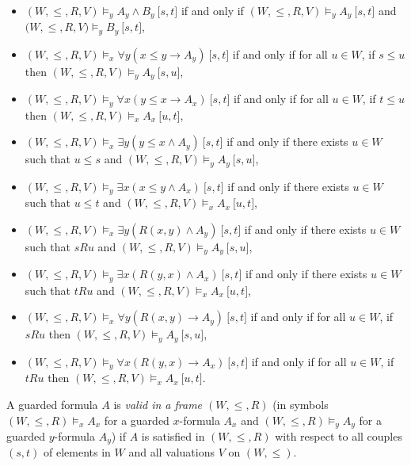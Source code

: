 \documentclass[draft]{article}
\begin{document}
\begin{itemize}
%
%
\item $(W,{\leq},{R},V){\models_{y}}A_{y}{\wedge}B_{y}\ \lbrack s,t\rbrack$ if and only if $(W,{\leq},{R},V){\models_{y}}A_{y}\ \lbrack s,t\rbrack$ and $(W,{\leq},
%
%
%
%
%
%
%
$\linebreak$
%
%
%
%
%
%
{R},V){\models_{y}}B_{y}\ \lbrack s,t\rbrack$,
%
%
\item $(W,{\leq},{R},V){\models_{x}}{\forall y}(x{\leq}y{\rightarrow}A_{y})\ \lbrack s,t\rbrack$ if and only if for all $u{\in}W$, if $s{\leq}u$ then $(W,{\leq},{R},V){\models_{y}}A_{y}\ \lbrack s,u\rbrack$,
%
%
\item $(W,{\leq},{R},V){\models_{y}}{\forall x}(y{\leq}x{\rightarrow}A_{x})\ \lbrack s,t\rbrack$ if and only if for all $u{\in}W$, if $t{\leq}u$ then $(W,{\leq},{R},V){\models_{x}}A_{x}\ \lbrack u,t\rbrack$,
%
%
\item $(W,{\leq},{R},V){\models_{x}}{\exists y}(y{\leq}x{\wedge}A_{y})\ \lbrack s,t\rbrack$ if and only if there exists $u{\in}W$ such that $u{\leq}s$ and $(W,{\leq},{R},V){\models_{y}}A_{y}\ \lbrack s,u\rbrack$,
%
%
\item $(W,{\leq},{R},V){\models_{y}}{\exists x}(x{\leq}y{\wedge}A_{x})\ \lbrack s,t\rbrack$ if and only if there exists $u{\in}W$ such that $u{\leq}t$ and $(W,{\leq},{R},V){\models_{x}}A_{x}\ \lbrack u,t\rbrack$,
%
%
\item $(W,{\leq},{R},V){\models_{x}}{\exists y}(R(x,y){\wedge}A_{y})\ \lbrack s,t\rbrack$ if and only if there exists $u{\in}W$ such that $s{R}u$ and $(W,{\leq},{R},V){\models_{y}}A_{y}\ \lbrack s,u\rbrack$,
%
%
\item $(W,{\leq},{R},V){\models_{y}}{\exists x}(R(y,x){\wedge}A_{x})\ \lbrack s,t\rbrack$ if and only if there exists $u{\in}W$ such that $t{R}u$ and $(W,{\leq},{R},V){\models_{x}}A_{x}\ \lbrack u,t\rbrack$,
%
%
\item $(W,{\leq},{R},V){\models_{x}}{\forall y}(R(x,y){\rightarrow}A_{y})\ \lbrack s,t\rbrack$ if and only if for all $u{\in}W$, if $s{R}u$ then $(W,{\leq},{R},V){\models_{y}}A_{y}\ \lbrack s,u\rbrack$,
%
%
\item $(W,{\leq},{R},V){\models_{y}}{\forall x}(R(y,x){\rightarrow}A_{x})\ \lbrack s,t\rbrack$ if and only if for all $u{\in}W$, if $t{R}u$ then $(W,{\leq},{R},V){\models_{x}}A_{x}\ \lbrack u,t\rbrack$.
%
%
\end{itemize}
%
%
%
%
A guarded formula $A$ is {\em valid in a frame $(W,{\leq},{R})$}\/ (in symbols $(W,{\leq},{R}){\models_{x}}A_{x}$ for a guarded $x$-formula $A_{x}$ and $(W,{\leq},{R}){\models_{y}}A_{y}$ for a guarded $y$-formula $A_{y}$) if $A$ is satisfied in $(W,{\leq},{R})$ with respect to all couples $(s,t)$ of elements in $W$ and all valuations $V$ on $(W,{\leq})$.
\end{document}
